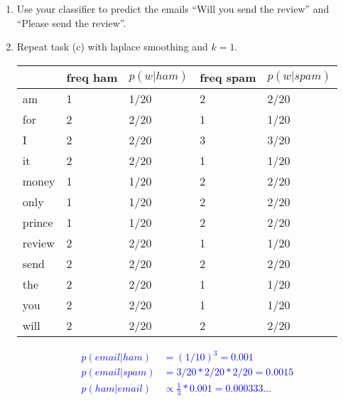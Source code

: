 \documentclass[11pt]{article}
\newif\ifsol
\begin{document}
\begin{enumerate}
\begin{enumerate}
\item Use your classifier to predict the emails ``Will you send the review'' and ``Please send the review''.\\
\ifsol
\textcolor{blue}{Those two are special cases. Since $p(review|spam)=0)$, we have a 0 probability for the whole term. The word ``please'' does not occur in the table and with the current approach, we can't compute the probabilities.} \newpage
\else
    \vspace{1cm}
\fi


\item Repeat task (c) with laplace smoothing and $k=1$.\\

\ifsol
\textcolor{blue}{
\begin{table}[h!]
\centering
\begin{tabular}{@{}lllll@{}}
\toprule
       & freq ham & $p(w|ham)$ & freq spam & $p(w|spam)$ \\ \midrule
am     & 1        & 1/20       & 2         & 2/20         \\
for    & 2        & 2/20       & 1         & 1/20           \\
I      & 2        & 2/20       & 3         & 3/20         \\
it     & 2        & 2/20       & 1         & 1/20           \\
money  & 1        & 1/20       & 2         & 2/20         \\
only   & 1        & 1/20       & 2         & 2/20         \\
prince & 1        & 1/20       & 2         & 2/20         \\
review & 2        & 2/20       & 1         & 1/20           \\
send   & 2        & 2/20       & 2         & 2/20         \\
the    & 2        & 2/20       & 1         & 1/20           \\
you    & 2        & 2/20       & 1         & 1/20           \\
will   & 2        & 2/20       & 2         & 2/20         \\
\bottomrule
\end{tabular}
\end{table}
\begin{align*}
p(email|ham) &= \left(1/10\right)^3 = 0.001\\
p(email|spam) &= 3/20 * 2/20 * 2/20 = 0.0015\\
p(ham|email) &\propto \frac{1}{3} * 0.001 = 0.000333...\\%

\end{align*}}
\end{enumerate}
\end{enumerate}
\end{document}
